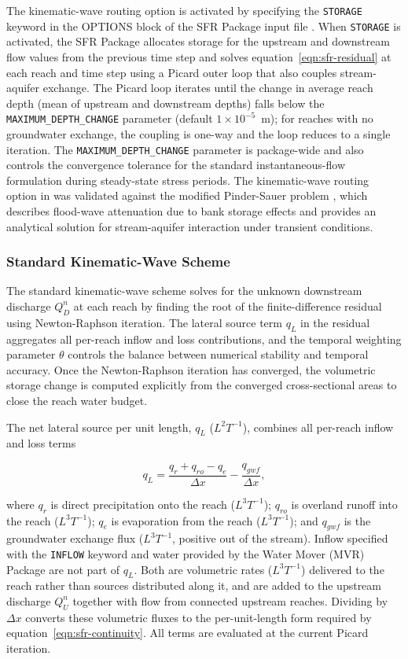 The kinematic-wave routing option is activated by specifying the \texttt{STORAGE} keyword in the OPTIONS block of the SFR Package input file \citep{modflow6gwf}. When \texttt{STORAGE} is activated, the SFR Package allocates storage for the upstream and downstream flow values from the previous time step and solves equation~\ref{eqn:sfr-residual} at each reach and time step using a Picard outer loop that also couples stream-aquifer exchange. The Picard loop iterates until the change in average reach depth (mean of upstream and downstream depths) falls below the \texttt{MAXIMUM\_DEPTH\_CHANGE} parameter (default $1 \times 10^{-5}$~m); for reaches with no groundwater exchange, the coupling is one-way and the loop reduces to a single iteration. The \texttt{MAXIMUM\_DEPTH\_CHANGE} parameter is package-wide and also controls the convergence tolerance for the standard instantaneous-flow formulation during steady-state stress periods. The kinematic-wave routing option in \mf was validated against the modified Pinder-Sauer problem \citep{pinder1971numerical, lal2001modification}, which describes flood-wave attenuation due to bank storage effects and provides an analytical solution for stream-aquifer interaction under transient conditions.

\subsubsection{Standard Kinematic-Wave Scheme}

The standard kinematic-wave scheme solves for the unknown downstream discharge $Q_D^n$ at each reach by finding the root of the finite-difference residual using Newton-Raphson iteration. The lateral source term $q_L$ in the residual aggregates all per-reach inflow and loss contributions, and the temporal weighting parameter $\theta$ controls the balance between numerical stability and temporal accuracy. Once the Newton-Raphson iteration has converged, the volumetric storage change is computed explicitly from the converged cross-sectional areas to close the reach water budget.

The net lateral source per unit length, $q_L$ ($L^2T^{-1}$), combines all per-reach inflow and loss terms

\begin{equation}
	\label{eqn:sfr-qlat}
	q_L = \frac{q_r + q_{ro} - q_e}{\Delta x} - \frac{q_{gwf}}{\Delta x} ,
\end{equation}

\noindent where $q_r$ is direct precipitation onto the reach ($L^3T^{-1}$); $q_{ro}$ is overland runoff into the reach ($L^3T^{-1}$); $q_e$ is evaporation from the reach ($L^3T^{-1}$); and $q_{gwf}$ is the groundwater exchange flux ($L^3T^{-1}$, positive out of the stream). Inflow specified with the \texttt{INFLOW} keyword and water provided by the Water Mover (MVR) Package are not part of $q_L$. Both are volumetric rates ($L^3T^{-1}$) delivered to the reach rather than sources distributed along it, and are added to the upstream discharge $Q_U^n$ together with flow from connected upstream reaches. Dividing by $\Delta x$ converts these volumetric fluxes to the per-unit-length form required by equation~\ref{eqn:sfr-continuity}. All terms are evaluated at the current Picard iteration.

